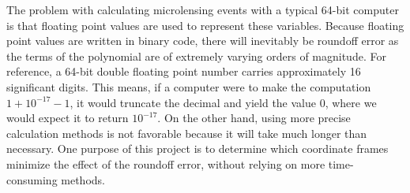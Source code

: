 \documentclass{article}
\begin{document}
The problem with calculating microlensing events with a typical 64-bit computer
is that floating point values are used to represent these variables. Because
floating point values are written in binary code, there will inevitably be
roundoff error as the terms of the polynomial are of extremely varying orders
of magnitude. For reference, a 64-bit double floating point number carries
approximately 16 significant digits. This means, if a computer were to make
the computation $1 + 10^{-17} - 1$, it would truncate the decimal and yield
the value $0$, where we would expect it to return $10^{-17}$. On the other
hand, using more precise calculation methods is not favorable because it will
take much longer than necessary. One purpose of this project is to
determine which coordinate frames minimize the effect of the roundoff error,
without relying on more time-consuming methods.
\end{document}
